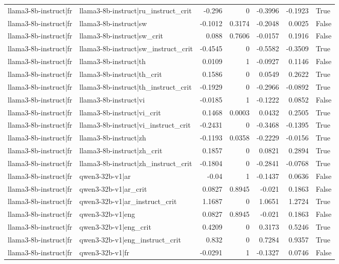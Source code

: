 \begin{table}
\begin{tabular}{l l r r r r l}
llama3-8b-instruct|fr & llama3-8b-instruct|ru_instruct_crit & -0.296 & 0 & -0.3996 & -0.1923 & True \\
llama3-8b-instruct|fr & llama3-8b-instruct|sw & -0.1012 & 0.3174 & -0.2048 & 0.0025 & False \\
llama3-8b-instruct|fr & llama3-8b-instruct|sw_crit & 0.088 & 0.7606 & -0.0157 & 0.1916 & False \\
llama3-8b-instruct|fr & llama3-8b-instruct|sw_instruct_crit & -0.4545 & 0 & -0.5582 & -0.3509 & True \\
llama3-8b-instruct|fr & llama3-8b-instruct|th & 0.0109 & 1 & -0.0927 & 0.1146 & False \\
llama3-8b-instruct|fr & llama3-8b-instruct|th_crit & 0.1586 & 0 & 0.0549 & 0.2622 & True \\
llama3-8b-instruct|fr & llama3-8b-instruct|th_instruct_crit & -0.1929 & 0 & -0.2966 & -0.0892 & True \\
llama3-8b-instruct|fr & llama3-8b-instruct|vi & -0.0185 & 1 & -0.1222 & 0.0852 & False \\
llama3-8b-instruct|fr & llama3-8b-instruct|vi_crit & 0.1468 & 0.0003 & 0.0432 & 0.2505 & True \\
llama3-8b-instruct|fr & llama3-8b-instruct|vi_instruct_crit & -0.2431 & 0 & -0.3468 & -0.1395 & True \\
llama3-8b-instruct|fr & llama3-8b-instruct|zh & -0.1193 & 0.0358 & -0.2229 & -0.0156 & True \\
llama3-8b-instruct|fr & llama3-8b-instruct|zh_crit & 0.1857 & 0 & 0.0821 & 0.2894 & True \\
llama3-8b-instruct|fr & llama3-8b-instruct|zh_instruct_crit & -0.1804 & 0 & -0.2841 & -0.0768 & True \\
llama3-8b-instruct|fr & qwen3-32b-v1|ar & -0.04 & 1 & -0.1437 & 0.0636 & False \\
llama3-8b-instruct|fr & qwen3-32b-v1|ar_crit & 0.0827 & 0.8945 & -0.021 & 0.1863 & False \\
llama3-8b-instruct|fr & qwen3-32b-v1|ar_instruct_crit & 1.1687 & 0 & 1.0651 & 1.2724 & True \\
llama3-8b-instruct|fr & qwen3-32b-v1|eng & 0.0827 & 0.8945 & -0.021 & 0.1863 & False \\
llama3-8b-instruct|fr & qwen3-32b-v1|eng_crit & 0.4209 & 0 & 0.3173 & 0.5246 & True \\
llama3-8b-instruct|fr & qwen3-32b-v1|eng_instruct_crit & 0.832 & 0 & 0.7284 & 0.9357 & True \\
llama3-8b-instruct|fr & qwen3-32b-v1|fr & -0.0291 & 1 & -0.1327 & 0.0746 & False \\

\end{tabular}
\end{table}
